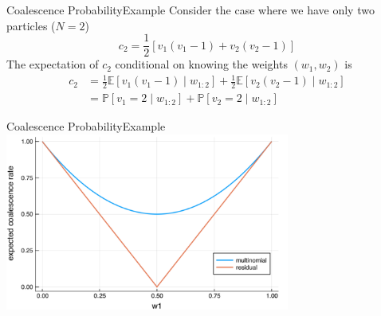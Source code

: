\documentclass[aspectratio=169]{beamer}
\theoremstyle{definition}
\newcommand{\PR}{\mathbb{P}}
\newcommand{\E}{\mathbb{E}}
\newcommand{\vt}[1]{v_{#1}}
\newcommand{\wt}[1]{w_{#1}}
\begin{document}
\begin{frame}{Coalescence Probability}{Example}
Consider the case where we have only two particles ($N=2$)
\begin{equation*}
c_2 = \frac{1}{2}\left[ \vt{1}(\vt{1}-1) + \vt{2}(\vt{2}-1)\right]
\end{equation*}
The expectation of $c_2$ conditional on knowing the weights $(\wt{1}, \wt{2})$ is
\begin{align*}
c_2 &= \frac{1}{2} \E[\vt{1}(\vt{1}-1) \mid \wt{1:2}] + \frac{1}{2} \E[\vt{2}(\vt{2}-1) \mid \wt{1:2}] \\
&= \PR[\vt{1}=2 \mid \wt{1:2}] + \PR[\vt{2}=2 \mid \wt{1:2}]
\end{align*}

%
\end{frame}


\begin{frame}{Coalescence Probability}{Example}
\centering
\includegraphics[width=0.7\textwidth]{EcN_mn_res_n2.pdf}

\end{frame}
\end{document}

